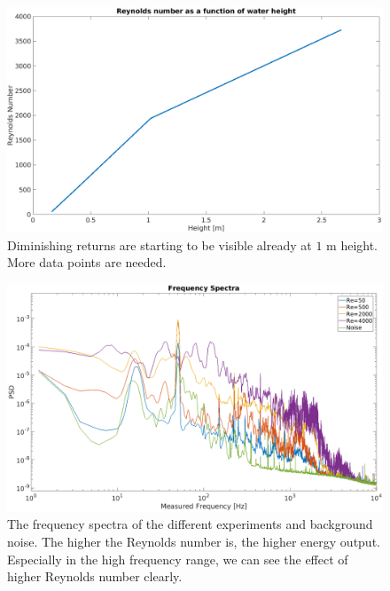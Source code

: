 \documentclass[english,a4paper,12pt]{article}
\begin{document}
\begin{figure}[H]
    \centering
    \includegraphics[width=170mm]{ReVsHeightPlot.png}
    \caption{Diminishing returns are starting to be visible already at $1$ m height. More data points are needed.}
    \label{fig:2}
\end{figure}

\begin{figure}[H]
    \centering
    \includegraphics[width=170mm]{FrequencySpectraPlot.png}
    \caption{The frequency spectra of the different experiments and background noise. The higher the Reynolds number is, the higher energy output. Especially in the high frequency range, we can see the effect of higher Reynolds number clearly.}
    \label{fig:3}
\end{figure}
\end{document}
